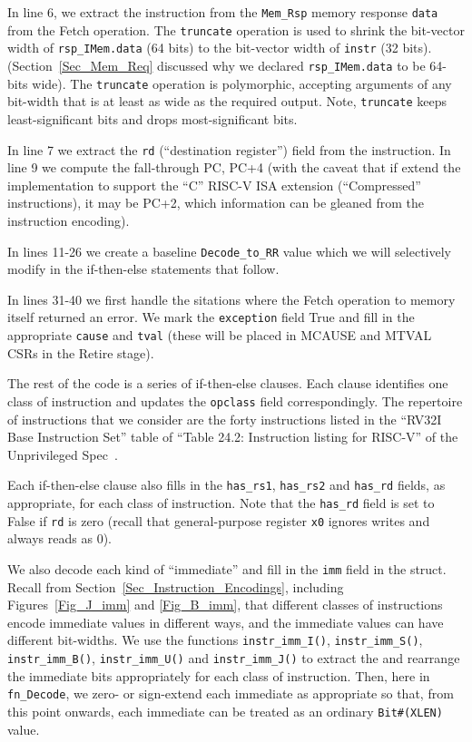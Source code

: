 


In line 6, we extract the instruction from the \verb|Mem_Rsp| memory
response \verb|data| from the Fetch operation. The \verb|truncate|
operation is used to shrink the bit-vector width of
\verb|rsp_IMem.data| (64 bits) to the bit-vector width of \verb|instr|
(32 bits).  (Section~\ref{Sec_Mem_Req} discussed why we declared
\verb|rsp_IMem.data| to be 64-bits wide).  The \verb|truncate|
operation is polymorphic, accepting arguments of any bit-width that is
at least as wide as the required output.  Note, \verb|truncate| keeps
least-significant bits and drops most-significant bits.

In line 7 we extract the \verb|rd| (``destination register'') field
from the instruction.  In line 9 we compute the fall-through PC, PC+4
(with the caveat that if extend the implementation to support the
``C'' RISC-V ISA extension (``Compressed'' instructions), it may be
PC+2, which information can be gleaned from the instruction encoding).

In lines 11-26 we create a baseline \verb|Decode_to_RR| value which we
will selectively modify in the if-then-else statements that follow.

In lines 31-40 we first handle the sitations where the Fetch operation
to memory itself returned an error.  We mark the \verb|exception|
field True and fill in the appropriate \verb|cause| and \verb|tval|
(these will be placed in MCAUSE and MTVAL CSRs in the Retire stage).

The rest of the code is a series of if-then-else clauses. Each clause
identifies one class of instruction and updates the \verb|opclass|
field correspondingly.  The repertoire of instructions that we
consider are the forty instructions listed in the ``RV32I Base
Instruction Set'' table of ``Table 24.2: Instruction listing for
RISC-V'' of the Unprivileged Spec~\cite{RISCV_Unpriv_2019_12_13}.

Each if-then-else clause also fills in the \verb|has_rs1|,
\verb|has_rs2| and \verb|has_rd| fields, as appropriate, for each
class of instruction.  Note that the \verb|has_rd| field is set to
False if \verb|rd| is zero (recall that general-purpose register
\verb|x0| ignores writes and always reads as 0).

We also decode each kind of ``immediate'' and fill in the \verb|imm|
field in the struct.  Recall from
Section~\ref{Sec_Instruction_Encodings}, including
Figures~\ref{Fig_J_imm} and \ref{Fig_B_imm}, that different classes of
instructions encode immediate values in different ways, and the
immediate values can have different bit-widths.  We use the functions
\verb|instr_imm_I()|, \verb|instr_imm_S()|, \verb|instr_imm_B()|,
\verb|instr_imm_U()| and \verb|instr_imm_J()| to extract the and
rearrange the immediate bits appropriately for each class of
instruction.  Then, here in \verb|fn_Decode|, we zero- or sign-extend
each immediate as appropriate so that, from this point onwards, each
immediate can be treated as an ordinary \verb|Bit#(XLEN)| value.

